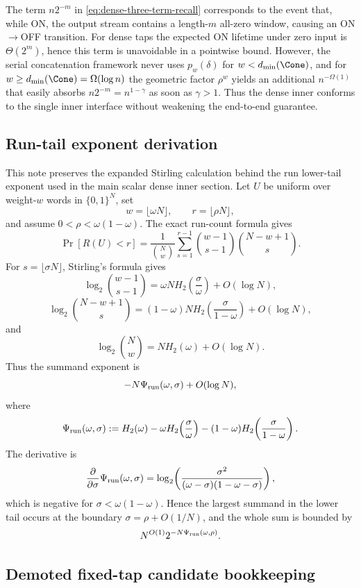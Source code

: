 \begin{remark}
\label{rem:dense-off-harmless}
The term $n2^{-m}$ in \eqref{eq:dense-three-term-recall} corresponds to the event that, while ON, the output stream
contains a length-$m$ all-zero window, causing an ON$\to$OFF transition.
For dense taps the expected ON lifetime under zero input is $\Theta(2^m)$, hence this term is unavoidable in a pointwise bound.
However, the serial concatenation framework never uses $p_w(\delta)$ for $w<d_{\min}(\Cone)$,
and for $w\ge d_{\min}(\Cone)=\Omega(\log n)$ the geometric factor $\rho^w$ yields an additional $n^{-\Omega(1)}$
that easily absorbs $n2^{-m}=n^{1-\gamma}$ as soon as $\gamma>1$.
Thus the dense inner conforms to the single inner interface without weakening the end-to-end guarantee.
\end{remark}

\subsection{Run-tail exponent derivation}

This note preserves the expanded Stirling calculation behind the run lower-tail exponent used in the main scalar dense
inner section.  Let \(U\) be uniform over weight-\(w\) words in \(\{0,1\}^N\), set
\[
w=\lfloor\omega N\rfloor,\qquad r=\lfloor\rho N\rfloor,
\]
and assume \(0<\rho<\omega(1-\omega)\).  The exact run-count formula gives
\[
\Pr[R(U)<r]
=
\frac{1}{\binom{N}{w}}
\sum_{s=1}^{r-1}
\binom{w-1}{s-1}\binom{N-w+1}{s}.
\]
For \(s=\lfloor\sigma N\rfloor\), Stirling's formula gives
\[
\log_2\binom{w-1}{s-1}
=
\omega N H_2\!\left(\frac{\sigma}{\omega}\right)+O(\log N),
\]
\[
\log_2\binom{N-w+1}{s}
=
(1-\omega)N H_2\!\left(\frac{\sigma}{1-\omega}\right)+O(\log N),
\]
and
\[
\log_2\binom{N}{w}=NH_2(\omega)+O(\log N).
\]
Thus the summand exponent is
\[
-N\Psi_{\rm run}(\omega,\sigma)+O(\log N),
\]
where
\[
\Psi_{\rm run}(\omega,\sigma)
:=
H_2(\omega)
-\omega H_2\!\left(\frac{\sigma}{\omega}\right)
-(1-\omega)H_2\!\left(\frac{\sigma}{1-\omega}\right).
\]
The derivative is
\[
\frac{\partial}{\partial\sigma}\Psi_{\rm run}(\omega,\sigma)
=
\log_2\!\left(\frac{\sigma^2}{(\omega-\sigma)(1-\omega-\sigma)}\right),
\]
which is negative for \(\sigma<\omega(1-\omega)\).  Hence the largest summand in the lower tail occurs at the boundary
\(\sigma=\rho+O(1/N)\), and the whole sum is bounded by
\[
N^{O(1)}2^{-N\Psi_{\rm run}(\omega,\rho)}.
\]

\subsection{Demoted fixed-tap candidate bookkeeping}

